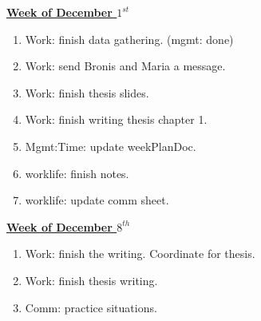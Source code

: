 \documentclass[11pt]{article}
\begin{document}

           {\small \underline{\textbf{Week of December $1^{st}$}}}
           \begin{enumerate}
             \tiny \item \tiny Work: finish data gathering. (mgmt: done)
           \item \tiny Work: send Bronis and Maria a message.
           \item \tiny Work: finish thesis slides.
           \item \tiny Work: finish writing thesis chapter 1.
           \item \tiny Mgmt:Time: update weekPlanDoc.
           \item \tiny worklife: finish notes.
           \item \tiny worklife: update comm sheet.
           \end{enumerate} 
           
           {\small \underline{\textbf{Week of December $8^{th}$}}}
           \begin{enumerate}
             \tiny \item \tiny Work: finish the writing. Coordinate for thesis.
           \item \tiny Work: finish thesis writing. 
           \item \tiny Comm: practice situations. 
           \end{enumerate}
           
\end{document}
